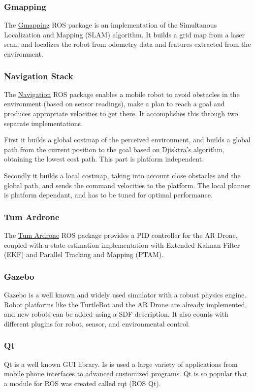 \documentclass[11pt,a4paper]{article}
\begin{document}
\subsubsection{Gmapping}
The \href{http://wiki.ros.org/gmapping}{Gmapping} ROS package is an implementation of the Simultanous Localization and Mapping (SLAM) algorithm. It builds a grid map from a laser scan, and localizes the robot from odometry data and features extracted from the environment.

\subsubsection{Navigation Stack}
The \href{http://wiki.ros.org/navigation}{Navigation} ROS package enables a mobile robot to avoid obstacles in the environment (based on sensor readings), make a plan to reach a goal and produces appropriate velocities to get there. It accomplishes this through two separate implementations. 

First it builds a global costmap of the perceived environment, and builds a global path from the current position to the goal based on Djisktra's algorithm, obtaining the lowest cost path. This part is platform independent. 

Secondly it builds a local costmap, taking into account close obstacles and the global path, and sends the command velocities to the platform. The local planner is  platform dependant, and has to be tuned for optimal performance.

\subsubsection{Tum Ardrone}
The \href{http://wiki.ros.org/tum_ardrone}{Tum Ardrone} ROS package provides a PID controller for the AR Drone, coupled with a state estimation implementation with Extended Kalman Filter (EKF) and Parallel Tracking and Mapping (PTAM).

\subsubsection{Gazebo}
Gazebo is a well known and widely used simulator with a robust physics engine. 
Robot platforms like the TurtleBot and the AR Drone are already implemented, and new robots can be added using a SDF description. It also counts with different plugins  for robot, sensor, and environmental control. 

\subsubsection{Qt}
Qt is a well known GUI library. Is is used a large variety of applications from mobile phone interfaces to advanced customized programs. Qt is so popular that a module for ROS was
created called rqt (ROS Qt).
\end{document}
